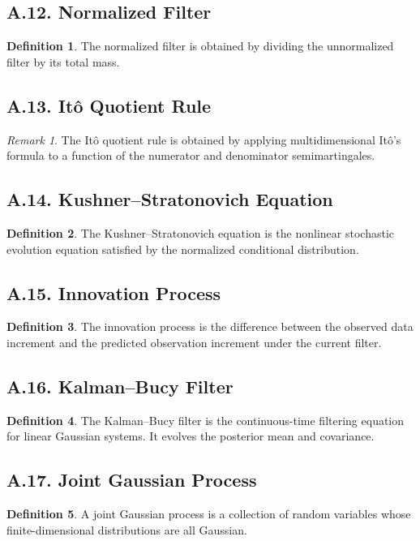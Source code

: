 \documentclass[11pt]{article}
\theoremstyle{definition}
\newtheorem{definition}{Definition}
\theoremstyle{remark}
\newtheorem{remark}{Remark}
\begin{document}
\subsection*{A.12. Normalized Filter}
\begin{definition}
The normalized filter is obtained by dividing the unnormalized filter by its total mass.
\end{definition}

\subsection*{A.13. It\^o Quotient Rule}
\begin{remark}
The It\^o quotient rule is obtained by applying multidimensional It\^o's formula to a function of the numerator and denominator semimartingales.
\end{remark}

\subsection*{A.14. Kushner--Stratonovich Equation}
\begin{definition}
The Kushner--Stratonovich equation is the nonlinear stochastic evolution equation satisfied by the normalized conditional distribution.
\end{definition}

\subsection*{A.15. Innovation Process}
\begin{definition}
The innovation process is the difference between the observed data increment and the predicted observation increment under the current filter.
\end{definition}

\subsection*{A.16. Kalman--Bucy Filter}
\begin{definition}
The Kalman--Bucy filter is the continuous-time filtering equation for linear Gaussian systems. It evolves the posterior mean and covariance.
\end{definition}

\subsection*{A.17. Joint Gaussian Process}
\begin{definition}
A joint Gaussian process is a collection of random variables whose finite-dimensional distributions are all Gaussian.
\end{definition}
\end{document}
